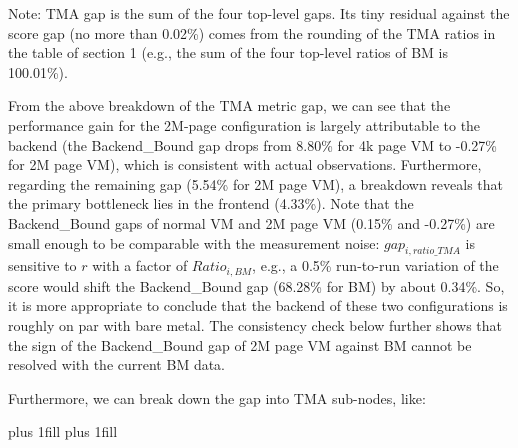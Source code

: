 \documentclass[12pt]{article}
\newcommand\tablefont{\normalfont}}}}
\newcommand{\npar}[1]{#1\par}
\newcommand{\emptypar}{\mbox{}\par}
\begin{document}
\npar{\hspace*{9.75pt}Note: TMA gap is the sum of the four top-level gaps. Its tiny residual against the score gap (no more than 0.02\%) comes from the rounding of the TMA ratios in the table of section 1 (e.g., the sum of the four top-level ratios of BM is 100.01\%).}
\emptypar
\npar{\hspace*{9.60pt}From the above breakdown of the TMA metric gap, we can see that the performance gain for the 2M-page configuration is largely attributable to the backend (the Backend\_Bound gap drops from 8.80\% for 4k page VM to -0.27\% for 2M page VM), which is consistent with actual observations. Furthermore, regarding the remaining gap (5.54\% for 2M page VM), a breakdown reveals that the primary bottleneck lies in the frontend (4.33\%). Note that the Backend\_Bound gaps of normal VM and 2M page VM (0.15\% and -0.27\%) are small enough to be comparable with the measurement noise: ${\mathit{gap}}_{\mathit{i},\mathit{ratio\_TMA}}$ is sensitive to $\mathit{r}$ with a factor of ${\mathit{Ratio}}_{\mathit{i},\mathit{BM}}$, e.g., a 0.5\% run-to-run variation of the score would shift the Backend\_Bound gap (68.28\% for BM) by about 0.34\%. So, it is more appropriate to conclude that the backend of these two configurations is roughly on par with bare metal. The consistency check below further shows that the sign of the Backend\_Bound gap of 2M page VM against BM cannot be resolved with the current BM data.}
\npar{\hspace*{9.60pt}Furthermore, we can break down the gap into TMA sub-nodes, like:}
\par\begingroup\tablefont\fontsize{11pt}{13.42pt}\selectfont\setlength{\tabcolsep}{5.40pt}\LTleft=0pt plus 1fill \LTright=0pt plus 1fill\setlength{\LTpre}{0pt}\setlength{\LTpost}{0pt}
\end{document}
